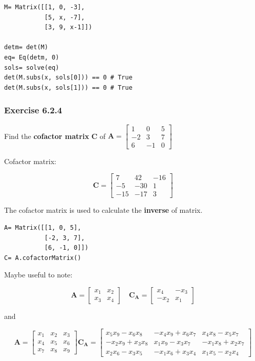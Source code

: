 \begin{verbatim}
M= Matrix([[1, 0, -3],
           [5, x, -7],
           [3, 9, x-1]])

detm= det(M)
eq= Eq(detm, 0)
sols= solve(eq)
det(M.subs(x, sols[0])) == 0 # True
det(M.subs(x, sols[1])) == 0 # True
\end{verbatim}

\subsubsection{Exercise 6.2.4}


Find the \textbf{cofactor matrix} \textbf{C} of $
\mathbf{A}= \left[\begin{matrix}1 & 0 & 5\\-2 & 3 & 7\\6 & -1 & 0\end{matrix}\right]
$

Cofactor matrix:

$$
\mathbf{C}= \left[\begin{matrix}7 & 42 & -16\\-5 & -30 & 1\\-15 & -17 & 3\end{matrix}\right]
$$

The cofactor matrix is used to calculate the \textbf{inverse} of matrix.

\begin{verbatim}
A= Matrix([[1, 0, 5],
           [-2, 3, 7],
           [6, -1, 0]])
C= A.cofactorMatrix()
\end{verbatim}

Maybe useful to note:

$$
\mathbf{A} = \left[\begin{matrix}x_{1} & x_{2}\\x_{3} & x_{4}\end{matrix}\right] \quad
\mathbf{C_A}= \left[\begin{matrix}x_{4} & - x_{3}\\- x_{2} & x_{1}\end{matrix}\right]
$$

and

$$
\mathbf{A} =  \left[\begin{matrix}x_{1} & x_{2} & x_{3}\\x_{4} & x_{5} & x_{6}\\x_{7} & x_{8} & x_{9}\end{matrix}\right]
\mathbf{C_A}= \left[\begin{matrix}
x_{5} x_{9} - x_{6} x_{8} & - x_{4} x_{9} + x_{6} x_{7} & x_{4} x_{8} - x_{5} x_{7}\\
- x_{2} x_{9} + x_{3} x_{8} & x_{1} x_{9} - x_{3} x_{7} & - x_{1} x_{8} + x_{2} x_{7}\\
x_{2} x_{6} - x_{3} x_{5} & - x_{1} x_{6} + x_{3} x_{4} & x_{1} x_{5} - x_{2} x_{4}
\end{matrix}\right]
$$

